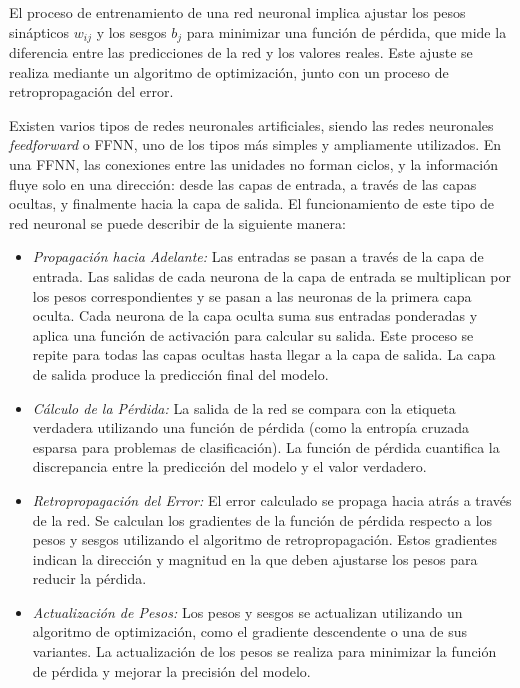 \documentclass[conference]{IEEEtran}
\begin{document}
El proceso de entrenamiento de una red neuronal implica ajustar los pesos sinápticos $w_{ij}$ y los sesgos $b_{j}$ para minimizar una función de pérdida, que mide la diferencia entre las predicciones de la red y los valores reales. Este ajuste se realiza mediante un algoritmo de optimización, junto con un proceso de retropropagación del error.

Existen varios tipos de redes neuronales artificiales, siendo las redes neuronales \textit{feedforward} o FFNN, uno de los tipos más simples y ampliamente utilizados. En una FFNN, las conexiones entre las unidades no forman ciclos, y la información fluye solo en una dirección: desde las capas de entrada, a través de las capas ocultas, y finalmente hacia la capa de salida. El funcionamiento de este tipo de red neuronal se puede describir de la siguiente manera:

\begin{itemize}
	\item \textit{Propagación hacia Adelante:} Las entradas se pasan a través de la capa de entrada. Las salidas de cada neurona de la capa de entrada se multiplican por los pesos correspondientes y se pasan a las neuronas de la primera capa oculta. Cada neurona de la capa oculta suma sus entradas ponderadas y aplica una función de activación para calcular su salida.	Este proceso se repite para todas las capas ocultas hasta llegar a la capa de salida.	La capa de salida produce la predicción final del modelo.
	\item \textit{Cálculo de la Pérdida:} La salida de la red se compara con la etiqueta verdadera utilizando una función de pérdida (como la entropía cruzada esparsa para problemas de clasificación). La función de pérdida cuantifica la discrepancia entre la predicción del modelo y el valor verdadero.
	\item \textit{Retropropagación del Error:} El error calculado se propaga hacia atrás a través de la red. Se calculan los gradientes de la función de pérdida respecto a los pesos y sesgos utilizando el algoritmo de retropropagación. Estos gradientes indican la dirección y magnitud en la que deben ajustarse los pesos para reducir la pérdida. 
	\item \textit{Actualización de Pesos:} Los pesos y sesgos se actualizan utilizando un algoritmo de optimización, como el gradiente descendente o una de sus variantes. La actualización de los pesos se realiza para minimizar la función de pérdida y mejorar la precisión del modelo.
\end{itemize}
\end{document}
